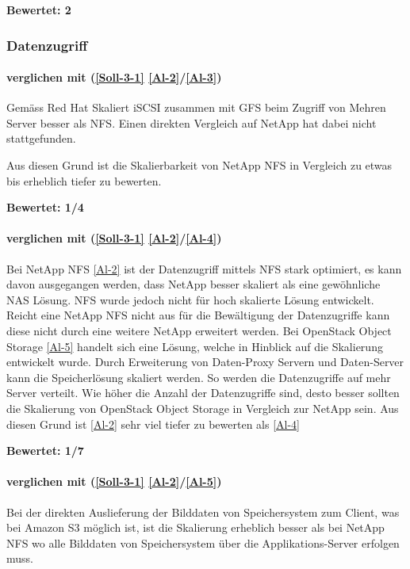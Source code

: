 \textbf{Bewertet: 2}


\subsubsection{Datenzugriff}

\paragraph*{  verglichen mit  (\ref{Soll-3-1} \ref{Al-2}/\ref{Al-3})}
Gemäss Red Hat Skaliert iSCSI zusammen mit GFS beim Zugriff von Mehren Server besser als NFS. Einen direkten Vergleich auf NetApp hat dabei nicht stattgefunden. 
\cite{O'Keefe2005}

Aus diesen Grund ist die Skalierbarkeit von NetApp NFS  in Vergleich zu  etwas bis erheblich tiefer zu bewerten.

\textbf{Bewertet: 1/4}

\paragraph*{  verglichen mit  (\ref{Soll-3-1} \ref{Al-2}/\ref{Al-4})}
Bei NetApp NFS \ref{Al-2} ist der Datenzugriff mittels NFS stark optimiert, es kann davon ausgegangen werden, dass NetApp besser skaliert als eine gewöhnliche NAS Lösung. NFS wurde jedoch nicht für hoch skalierte Lösung entwickelt. Reicht eine NetApp NFS nicht aus für die Bewältigung der Datenzugriffe kann diese nicht durch eine weitere NetApp erweitert werden. Bei OpenStack Object Storage \ref{Al-5} handelt sich eine Lösung, welche in Hinblick auf die Skalierung entwickelt wurde. Durch Erweiterung von Daten-Proxy Servern und Daten-Server kann die Speicherlösung skaliert werden. So werden die Datenzugriffe auf mehr Server verteilt. Wie höher die Anzahl der Datenzugriffe sind, desto besser sollten die Skalierung von OpenStack Object Storage in Vergleich zur NetApp sein.
Aus diesen Grund ist \ref{Al-2} sehr viel tiefer zu bewerten als \ref{Al-4}

\textbf{Bewertet: 1/7}

\paragraph*{  verglichen mit  (\ref{Soll-3-1} \ref{Al-2}/\ref{Al-5})}
Bei der direkten Auslieferung der Bilddaten von Speichersystem zum Client, was bei Amazon S3 möglich ist, ist die Skalierung erheblich besser als bei NetApp NFS wo alle Bilddaten von Speichersystem über die Applikations-Server erfolgen muss. 

